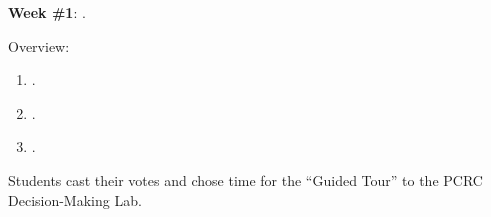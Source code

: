\documentclass[letterpaper]{article}
\renewenvironment{itemize}{
  \begin{list}{}{
    \setlength{\leftmargin}{1.5em}
  }
}{
  \end{list}
}
\begin{document}
\begin{enumerate}

\item {\bf Week \#1}: {\color{ForestGreen}{\bf Causal Inference in Social Sciences}}.

      \begin{itemize} 

        \item[$\diamond$] Overview:

        \begin{enumerate}

          \item[$\bullet$] \href{https://doi.org/10.1017/9781108991353.003}{}.



          \item[$\bullet$] \href{https://doi.org/10.1017/CBO9781107587991.003}{}.


          \item[$\bullet$] \href{https://www.jstor.org/stable/270939}{}.










        \end{enumerate}

        \item[{\color{red}$\diamond$}] {\color{red} Students cast their votes \href{https://doodle.com/meeting/participate/id/dLnyLoXa}{{}} and chose time for the ``Guided Tour'' to the PCRC Decision-Making Lab}.



\end{itemize}
\end{enumerate}
\end{document}
